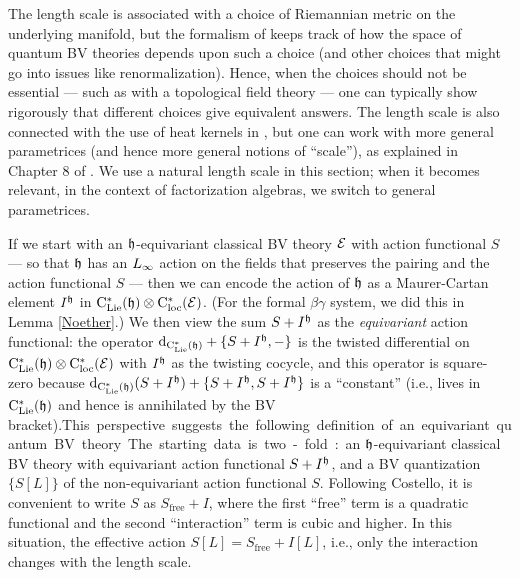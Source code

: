 \begin{rmk}
The length scale is associated with a choice of Riemannian metric on the underlying manifold,
but the formalism of \cite{CosBook} keeps track of how the space of quantum BV theories depends upon such a choice 
(and other choices that might go into issues like renormalization).
Hence, when the choices should not be essential --- such as with a topological field theory --- one can typically show rigorously that different choices give equivalent answers.
The length scale is also connected with the use of heat kernels in \cite{CosBook},
but one can work with more general parametrices (and hence more general notions of ``scale''),
as explained in Chapter 8 of \cite{CG2}.
We use a natural length scale in this section; 
when it becomes relevant, in the context of factorization algebras, we switch to general parametrices.
\end{rmk}

If we start with an $\mathfrak h$-equivariant classical BV theory $\mathcal E$ with action functional $S$ --- so that $\mathfrak h$ has an $\L8$ action on the fields that preserves the pairing and the action functional $S$ --- then we can encode the action of $\mathfrak h$ as a Maurer-Cartan element $I^\mathfrak h$ in ${\rm C}_{\rm Lie}^*(\mathfrak h) \otimes {\rm C}^*_{\rm loc}(\mathcal E)$.
(For the formal $\beta\gamma$ system, we did this in Lemma \ref{Noether}.)
We then view the sum $S + I^\mathfrak h$ as the \emph{equivariant} action functional:
the operator ${\rm d}_{{\rm C}_{\rm Lie}^*(\mathfrak h)} + \{S+ I^\mathfrak h,-\}$ is the twisted differential on ${\rm C}_{\rm Lie}^*(\mathfrak h) \otimes {\rm C}^*_{\rm loc}(\mathcal E)$ with $I^\mathfrak h$ as the twisting cocycle,
and this operator is square-zero because ${\rm d}_{{\rm C}_{\rm Lie}^*(\mathfrak h)}(S + I^\mathfrak h) + \{S + I^\mathfrak h, S+ I^\mathfrak h\}$ is a ``constant'' (i.e., lives in ${\rm C}_{\rm Lie}^*(\mathfrak h)$ and hence is annihilated by the BV bracket).\si

This perspective suggests the following definition of an equivariant quantum BV theory.
The starting data is two-fold:
an $\mathfrak h$-equivariant classical BV theory with equivariant action functional $S+I^\mathfrak h$, 
and a BV quantization $\{S[L]\}$ of the non-equivariant action functional $S$.
Following Costello, it is convenient to write $S$ as $S_{\text{free}} + I$, 
where the first ``free'' term is a quadratic functional and the second ``interaction'' term is cubic and higher.
In this situation, the effective action $S[L] = S_{\text{free}} + I[L]$, 
i.e., only the interaction changes with the length scale.

